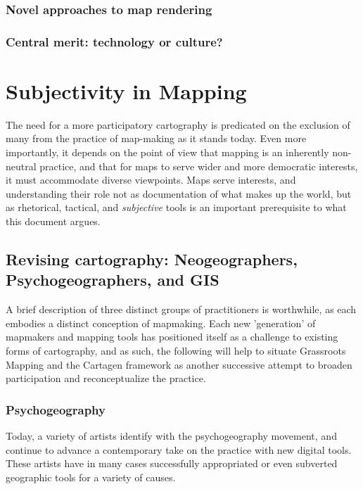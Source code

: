 \documentclass[11pt]{report}
\begin{document}
\subsection{Novel approaches to map rendering}
\subsection{Central merit: technology or culture?}

\chapter{Subjectivity in Mapping}


The need for a more participatory cartography is predicated on the exclusion of many from the practice of map-making as it stands today. Even more importantly, it depends on the point of view that mapping is an inherently non-neutral practice, and that for maps to serve wider and more democratic interests, it must accommodate diverse viewpoints. Maps serve interests, and understanding their role not as documentation of what makes up the world, but as rhetorical, tactical, and \emph{subjective} tools is an important prerequisite to what this document argues.

\section{Revising cartography: Neogeographers, Psychogeographers, and GIS}

A brief description of three distinct groups of practitioners is worthwhile, as each embodies a distinct conception of mapmaking. Each new 'generation' of mapmakers and mapping tools has positioned itself as a challenge to existing forms of cartography, and as such, the following will help to situate Grassroots Mapping and the Cartagen framework as another successive attempt to broaden participation and reconceptualize the practice. 

\subsection{Psychogeography}

Today, a variety of artists identify with the psychogeography movement, and continue to advance a contemporary take on the practice with new digital tools. These artists have in many cases successfully appropriated or even subverted geographic tools for a variety of causes. 
\end{document}
